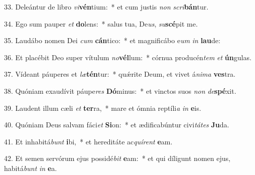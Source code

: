 33. Deleántur de libro \textit{vi}\textbf{vén}tium:~*  et cum justis \textit{non} \textit{scri}\textbf{bán}tur.\

34. Ego sum pauper \textit{et} \textbf{do}lens:~*  salus tua, De\textit{us}, \textit{su}\textbf{scé}pit me.\

35. Laudábo nomen Dei \textit{cum} \textbf{cán}tico:~*  et magnificábo e\textit{um} \textit{in} \textbf{lau}de:\

36. Et placébit Deo super vítulum \textit{no}\textbf{vél}lum:~*  córnua producén\textit{tem} \textit{et} \textbf{ún}gulas.\

37. Vídeant páuperes et \textit{læ}\textbf{tén}tur:~*  quǽrite Deum, et vivet á\textit{ni}\textit{ma} \textbf{ves}tra.\

38. Quóniam exaudívit páupe\textit{res} \textbf{Dó}minus:~*  et vinctos suos \textit{non} \textit{de}\textbf{spé}xit.\

39. Laudent illum cæli \textit{et} \textbf{ter}ra,~*  mare et ómnia reptíli\textit{a} \textit{in} \textbf{e}is.\

40. Quóniam Deus salvam fáci\textit{et} \textbf{Si}on:~*  et ædificabúntur civi\textit{tá}\textit{tes} \textbf{Ju}da.\

41. Et inhabitá\textit{bunt} \textbf{i}bi,~*  et hereditáte ac\textit{quí}\textit{rent} \textbf{e}am.\

42. Et semen servórum ejus possidé\textit{bit} \textbf{e}am:~*  et qui díligunt nomen ejus, habitá\textit{bunt} \textit{in} \textbf{e}a.\

